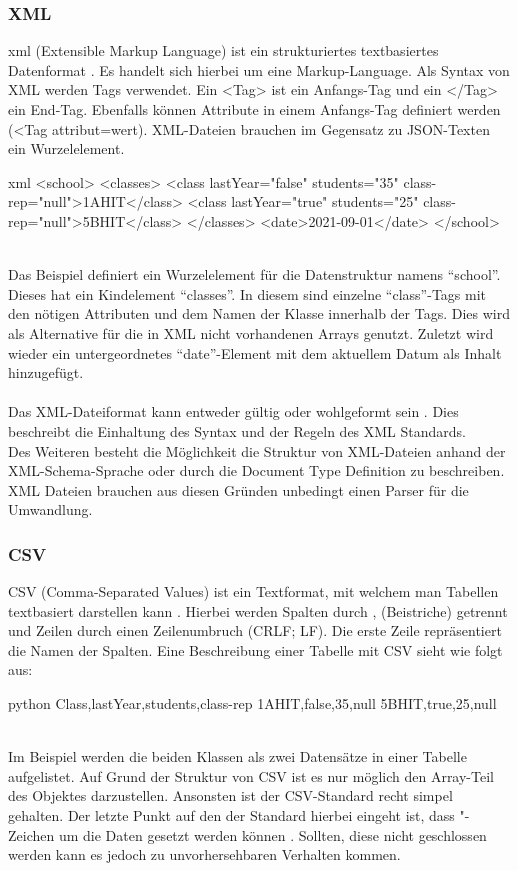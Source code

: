 		\subsubsection{XML}
		\Gls{xml} (Extensible Markup Language) ist ein strukturiertes textbasiertes Datenformat \cite{xmlStandard}. Es handelt sich hierbei um eine Markup-Language. Als Syntax von XML werden Tags verwendet. Ein <Tag> ist ein Anfangs-Tag und ein </Tag> ein End-Tag. Ebenfalls können Attribute in einem Anfangs-Tag definiert werden (<Tag attribut=\dq wert\dq ). XML-Dateien brauchen im Gegensatz zu JSON-Texten ein Wurzelelement.
		\begin{code}{xml}
		<school>
			<classes>
				<class lastYear="false" students="35" class-rep="null">1AHIT</class>
				<class lastYear="true" students="25" class-rep="null">5BHIT</class>
			</classes>
			<date>2021-09-01</date>
		</school>
		\end{code}
		\label{code:xml}~\\
		Das Beispiel definiert ein Wurzelelement für die Datenstruktur namens \enquote{school}. Dieses hat ein Kindelement \enquote{classes}. In diesem sind einzelne \enquote{class}-Tags mit den nötigen Attributen und dem Namen der Klasse innerhalb der Tags. Dies wird als Alternative für die in XML nicht vorhandenen Arrays genutzt. Zuletzt wird wieder ein untergeordnetes \enquote{date}-Element mit dem aktuellem Datum als Inhalt hinzugefügt.\\~\\
		Das XML-Dateiformat kann entweder gültig oder wohlgeformt sein \cite{xmlStandard}. Dies beschreibt die Einhaltung des Syntax und der Regeln des XML Standards.\\
		Des Weiteren besteht die Möglichkeit die Struktur von XML-Dateien anhand der XML-Schema-Sprache oder durch die Document Type Definition zu beschreiben. XML Dateien brauchen aus diesen Gründen unbedingt einen Parser für die Umwandlung.
		
		\newpage
		
		\subsubsection{CSV}
		CSV (Comma-Separated Values) ist ein Textformat, mit welchem man Tabellen textbasiert darstellen kann \cite{rfc4180}. Hierbei werden Spalten durch \dq , \dq  (Beistriche) getrennt und Zeilen durch einen Zeilenumbruch (CRLF; LF). Die erste Zeile repräsentiert die Namen der Spalten. Eine Beschreibung einer Tabelle mit CSV sieht wie folgt aus:
		\begin{code}{python}
			Class,lastYear,students,class-rep
			1AHIT,false,35,null
			5BHIT,true,25,null
		\end{code}
		\label{code:csv}~\\
		Im Beispiel werden die beiden Klassen als zwei Datensätze in einer Tabelle aufgelistet. Auf Grund der Struktur von CSV ist es nur möglich den Array-Teil des Objektes darzustellen. Ansonsten ist der CSV-Standard recht simpel gehalten. Der letzte Punkt auf den der Standard hierbei eingeht ist, dass "-Zeichen um die Daten gesetzt werden können \cite{rfc4180}. Sollten, diese nicht geschlossen werden kann es jedoch zu unvorhersehbaren Verhalten kommen.
